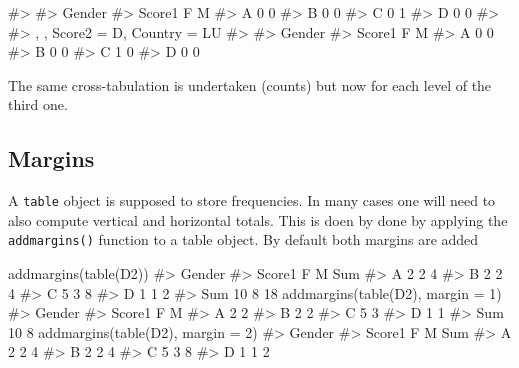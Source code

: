 \documentclass[
  letterpaper,
  DIV=11,
  numbers=noendperiod]{scrreprt}
\newenvironment{Shaded}{\begin{snugshade}}{\end{snugshade}}
\newcommand{\AttributeTok}[1]{\textcolor[rgb]{0.40,0.45,0.13}{#1}}
\newcommand{\CommentTok}[1]{\textcolor[rgb]{0.37,0.37,0.37}{#1}}
\newcommand{\DecValTok}[1]{\textcolor[rgb]{0.68,0.00,0.00}{#1}}
\newcommand{\FunctionTok}[1]{\textcolor[rgb]{0.28,0.35,0.67}{#1}}
\newcommand{\NormalTok}[1]{\textcolor[rgb]{0.00,0.23,0.31}{#1}}
\begin{document}
\begin{Shaded}
\begin{Highlighting}[]
\CommentTok{\#\textgreater{} }
\CommentTok{\#\textgreater{}       Gender}
\CommentTok{\#\textgreater{} Score1 F M}
\CommentTok{\#\textgreater{}      A 0 0}
\CommentTok{\#\textgreater{}      B 0 0}
\CommentTok{\#\textgreater{}      C 0 1}
\CommentTok{\#\textgreater{}      D 0 0}
\CommentTok{\#\textgreater{} }
\CommentTok{\#\textgreater{} , , Score2 = D, Country = LU}
\CommentTok{\#\textgreater{} }
\CommentTok{\#\textgreater{}       Gender}
\CommentTok{\#\textgreater{} Score1 F M}
\CommentTok{\#\textgreater{}      A 0 0}
\CommentTok{\#\textgreater{}      B 0 0}
\CommentTok{\#\textgreater{}      C 1 0}
\CommentTok{\#\textgreater{}      D 0 0}
\end{Highlighting}
\end{Shaded}

The same cross-tabulation is undertaken (counts) but now for each level
of the third one.

\subsection{Margins}\label{margins}

A \texttt{table} object is supposed to store frequencies. In many cases
one will need to also compute vertical and horizontal totals. This is
doen by done by applying the \texttt{addmargins()} function to a table
object. By default both margins are added

\begin{Shaded}
\begin{Highlighting}[]
\FunctionTok{addmargins}\NormalTok{(}\FunctionTok{table}\NormalTok{(D2))}
\CommentTok{\#\textgreater{}       Gender}
\CommentTok{\#\textgreater{} Score1  F  M Sum}
\CommentTok{\#\textgreater{}    A    2  2   4}
\CommentTok{\#\textgreater{}    B    2  2   4}
\CommentTok{\#\textgreater{}    C    5  3   8}
\CommentTok{\#\textgreater{}    D    1  1   2}
\CommentTok{\#\textgreater{}    Sum 10  8  18}
\FunctionTok{addmargins}\NormalTok{(}\FunctionTok{table}\NormalTok{(D2), }\AttributeTok{margin =} \DecValTok{1}\NormalTok{)}
\CommentTok{\#\textgreater{}       Gender}
\CommentTok{\#\textgreater{} Score1  F  M}
\CommentTok{\#\textgreater{}    A    2  2}
\CommentTok{\#\textgreater{}    B    2  2}
\CommentTok{\#\textgreater{}    C    5  3}
\CommentTok{\#\textgreater{}    D    1  1}
\CommentTok{\#\textgreater{}    Sum 10  8}
\FunctionTok{addmargins}\NormalTok{(}\FunctionTok{table}\NormalTok{(D2), }\AttributeTok{margin =} \DecValTok{2}\NormalTok{)}
\CommentTok{\#\textgreater{}       Gender}
\CommentTok{\#\textgreater{} Score1 F M Sum}
\CommentTok{\#\textgreater{}      A 2 2   4}
\CommentTok{\#\textgreater{}      B 2 2   4}
\CommentTok{\#\textgreater{}      C 5 3   8}
\CommentTok{\#\textgreater{}      D 1 1   2}
\end{Highlighting}
\end{Shaded}
\end{document}

